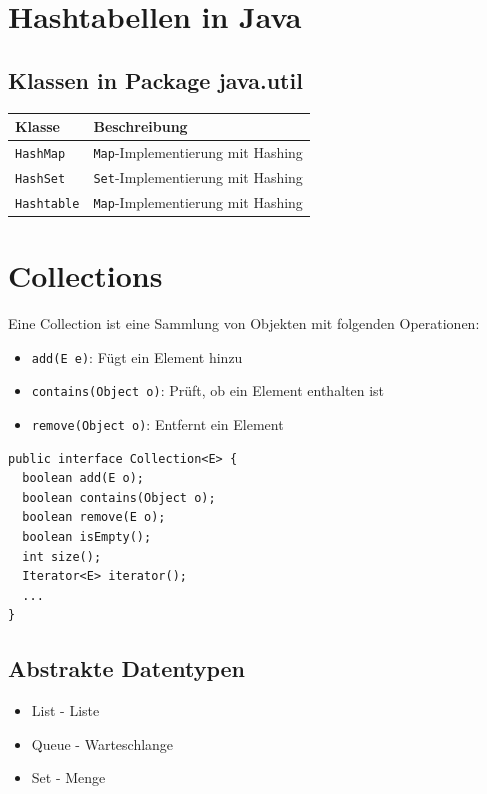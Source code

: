 \documentclass{scrreprt}
\begin{document}
\section{Hashtabellen in Java}
\subsection{Klassen in Package java.util}
\begin{tabular}{|l|l|}
\hline
\textbf{Klasse} & \textbf{Beschreibung} \\
\hline
\texttt{HashMap} & \texttt{Map}-Implementierung mit Hashing \\
\texttt{HashSet} & \texttt{Set}-Implementierung mit Hashing \\
\texttt{Hashtable} & \texttt{Map}-Implementierung mit Hashing \\
\hline
\end{tabular}
\section{Collections}
Eine Collection ist eine Sammlung von Objekten mit folgenden Operationen:
\begin{itemize}
  \item \texttt{add(E e)}: Fügt ein Element hinzu
  \item \texttt{contains(Object o)}: Prüft, ob ein Element enthalten ist
  \item \texttt{remove(Object o)}: Entfernt ein Element
\end{itemize}
\begin{lstlisting}
public interface Collection<E> {
  boolean add(E o);
  boolean contains(Object o);
  boolean remove(E o);
  boolean isEmpty();
  int size();
  Iterator<E> iterator();
  ...
}
\end{lstlisting}
\subsection{Abstrakte Datentypen}
\begin{itemize}
  \item List - Liste
  \item Queue - Warteschlange
  \item Set - Menge
\end{itemize}
\end{document}

